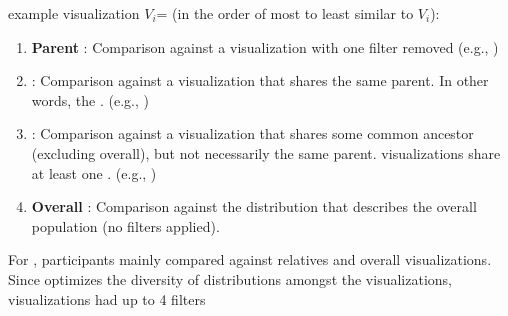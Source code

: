 example visualization $V_i$=\texttt{} (in the order of most to least similar to $V_i$): %
\begin{enumerate}
	\item \textbf{Parent} : Comparison against a visualization with one
	filter removed (e.g., \texttt{})
	\item \textbf{} : Comparison against a visualization that shares the same parent. In other words, the . (e.g., \texttt{})
	\item \textbf{} : Comparison against a visualization that shares some common ancestor (excluding overall), but not necessarily the same parent.  visualizations share at least one . (e.g., \texttt{})
	\item \textbf{Overall} : Comparison against the distribution that describes the overall population (no filters applied).
\end{enumerate}
\par {}
For \cluster, participants mainly compared
against relatives and overall visualizations.
Since \cluster optimizes the diversity of distributions
amongst the  visualizations,
 visualizations had up to 4 filters
